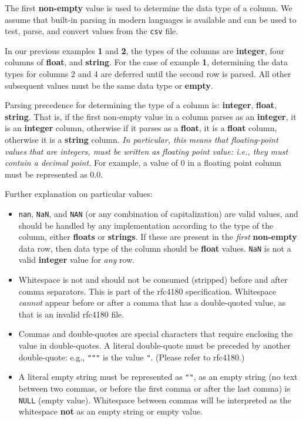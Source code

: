 The first \textbf{non-empty} value is used to determine the data type of a
column.  We assume that built-in parsing in modern languages is available and
can be used to test, parse, and convert values from the \texttt{\small csv}
file.

In our previous examples {\bf 1} and {\bf 2}, the types of the columns are
\textbf{integer}, four columns of \textbf{float}, and \textbf{string}. For
the case of example {\bf 1}, determining the data types for columns 2 and 4
are deferred until the second row is parsed. All other subsequent values must
be the same data type or \textbf{empty}.

Parsing precedence for determining the type of a column is: \textbf{integer},
\textbf{float}, \textbf{string}. That is, if the first non-empty value in a
column parses as an \textbf{integer}, it is an \textbf{integer} column,
otherwise if it parses as a \textbf{float}, it is a \textbf{float} column,
otherwise it is a \textbf{string} column. \textit{In particular, this means
that floating-point values that are integers, must be written as floating point
value: i.e., they must contain a decimal point.} For example, a value of 0 in a
floating point column must be represented as 0.0.

Further explanation on particular values:
\begin{itemize}
\item \texttt{\small nan}, \texttt{\small NaN}, and \texttt{NAN} (or any
  combination of capitalization) are valid values, and should be handled by any
  implementation according to the type of the column, either \textbf{floats}
  or \textbf{strings}. If these are present in the \textit{first}
  \textbf{non-empty} data row, then data type of the column should be
  \textbf{float} values. \texttt{\small NaN} is not a valid \textbf{integer}
  value for \textit{any} row.
\item Whitespace is not and should not be consumed (stripped) before and after
  comma separators.  This is part of the rfc4180 specification. Whitespace {\em
  cannot} appear before or after a comma that has a double-quoted value, as
  that is an invalid rfc4180 file.
\item Commas and double-quotes are special characters that require
  enclosing the value in double-quotes. A literal double-quote must be preceded
  by another double-quote: e.g., \texttt{\small """} is the value
  \texttt{\small "}. (Please refer to rfc4180.)
\item A literal empty string must be represented as \texttt{\small ""}, as an
  empty string (no text between two commas, or before the first comma
  or after the last comma) is \texttt{\small NULL} (empty value). Whitespace
  between commas will be interpreted as the whitespace \textbf{not} as an
  empty string or empty value.
\end{itemize}

